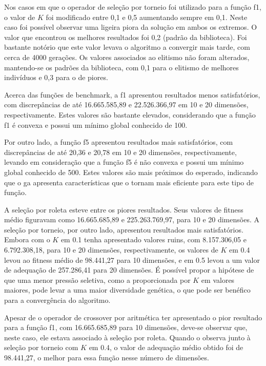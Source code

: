 Nos casos em que o operador de seleção por torneio foi utilizado para a função \gls{f1}, o valor de \( K \) foi modificado entre 0,1 e 0,5 aumentando sempre em 0,1.
Neste caso foi possível observar uma ligeira piora da solução em ambos os extremos.
O valor que encontrou os melhores resultados foi 0,2 (padrão da biblioteca).
Foi bastante notório que este valor levava o algoritmo a convergir mais tarde, com cerca de 4000 gerações.
Os valores associados ao elitismo não foram alterados, mantendo-se os padrões da biblioteca, com 0,1 para o elitismo de melhores indivíduos e 0,3 para o de piores.

Acerca das funções de benchmark, a \gls{f1} apresentou resultados menos satisfatórios, com discrepâncias de até 16.665.585,89 e 22.526.366,97 em 10 e 20 dimensões, respectivamente.
Estes valores são bastante elevados, considerando que a função \gls{f1} é convexa e possui um mínimo global conhecido de 100.

Por outro lado, a função \gls{f5} apresentou resultados mais satisfatórios, com discrepâncias de até 20,36 e 20,78 em 10 e 20 dimensões, respectivamente, levando em consideração que a função \gls{f5} é não convexa e possui um mínimo global conhecido de 500.
Estes valores são mais próximos do esperado, indicando que o \gls{ga} apresenta características que o tornam mais eficiente para este tipo de função.

A seleção por roleta esteve entre os piores resultados. Seus valores de \gls{fitness} médio figuravam como 16.665.685,89 e 225.263.769,97, para 10 e 20 dimensões.
A seleção por torneio, por outro lado, apresentou resultados mais satisfatórios.
Embora com o \( K \) em 0.1 tenha apresentado valores ruins, com 8.157.306,05 e 6.792.308,18, para 10 e 20 dimensões, respectivamente, os valores de \( K \) em 0.4 levou ao \gls{fitness} médio de 98.441,27 para 10 dimensões, e em 0.5 levou a um valor de adequação de 257.286,41 para 20 dimensões.
É possível propor a hipótese de que uma menor pressão seletiva, como a proporcionada por \( K \) em valores maiores, pode levar a uma maior diversidade genética, o que pode ser benéfico para a convergência do algoritmo.

Apesar de o operador de \gls{crossover} por aritmética ter apresentado o pior resultado para a função \gls{f1}, com 16.665.685,89 para 10 dimensões, deve-se observar que, neste caso, ele estava associado à seleção por roleta.
Quando o observa junto à seleção por torneio com \( K \) em 0.4, o valor de adequação médio obtido foi de 98.441,27, o melhor para essa função nesse número de dimensões.